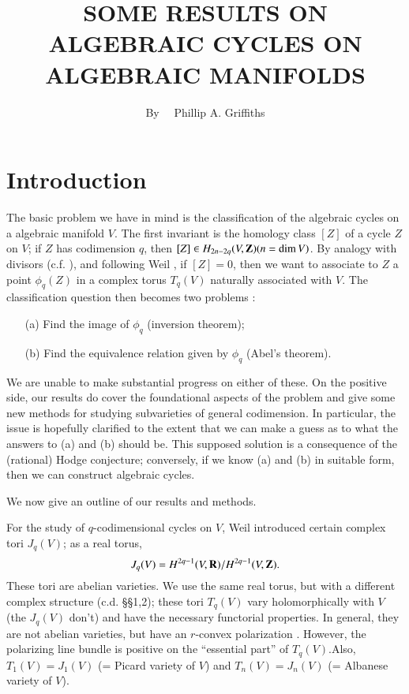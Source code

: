\title{SOME RESULTS ON ALGEBRAIC CYCLES ON ALGEBRAIC MANIFOLDS}

\author{By~~ Phillip A. Griffiths}

\date{}

\maketitle

\setcounter{pageoriginal}{92}
\setcounter{section}{-1}
\section{Introduction}\label{art08-sec0}\pageoriginale

The basic problem we have in mind is the classification of the algebraic cycles on a algebraic manifold $V$. The first invariant is the homology class $[Z]$ of a cycle $Z$ on $V$; if $Z$ has codimension $q$, then $[Z]\in H_{2n-2q}(V,\mathbf{Z})(n=\dim V)$. By analogy with divisors (c.f. \cite{art08-cite18}), and following Weil \cite{art08-key22}, if $[Z]=0$, then we want to associate to $Z$ a point $\phi_{q}(Z)$ in a complex torus $T_{q}(V)$ naturally associated with $V$. The classification question then becomes two problems :
\begin{itemize}
\item[(a)] Find the image of $\phi_{q}$ (inversion theorem);

\item[(b)] Find the equivalence relation given by $\phi_{q}$ (Abel's theorem).
\end{itemize}

We are unable to make substantial progress on either of these. On the positive side, our results do cover the foundational aspects of the problem and give some new methods for studying subvarieties of general codimension. In particular, the issue is hopefully clarified to the extent that we can make a guess as to what the answers to (a) and (b) should be. This supposed solution is a consequence of the (rational) Hodge conjecture; conversely, if we know (a) and (b) in suitable form, then we can construct algebraic cycles.

We now give an outline of our results and methods.

For the study of $q$-codimensional cycles on $V$, Weil introduced certain complex tori $J_{q}(V)$; as a real torus,
$$
J_{q}(V)=H^{2q-1}(V,\mathbf{R})/H^{2q-1}(V,\mathbf{Z}).
$$
These tori are abelian varieties. We use the same real torus, but with a different complex structure (c.d. \S\S1,2); these tori $T_{q}(V)$ vary holomorphically with $V$ (the $J_{q}(V)$ don't) and have the necessary functorial properties. In general, they are not abelian varieties, but have an $r$-convex polarization \cite{art08-key9}. However, the polarizing line bundle is positive on the ``essential part'' of $T_{q}(V)$.\pageoriginale Also, $T_{1}(V)=J_{1}(V)$ (= Picard variety of $V$) and $T_{n}(V)=J_{n}(V)$ (= Albanese variety of $V$).

